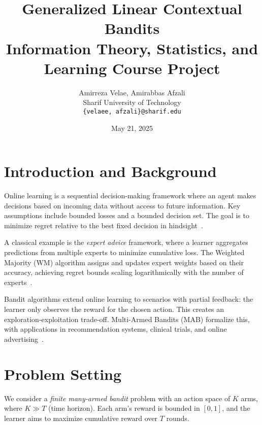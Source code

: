 \documentclass[10pt,twocolumn]{article}
\title{Generalized Linear Contextual Bandits\\
\large Information Theory, Statistics, and Learning Course Project}
\author{Amirreza Velae, Amirabbas Afzali\\
Sharif University of Technology\\
\texttt{\{velaee, afzali\}@sharif.edu}}
\date{May 21, 2025}
\begin{document}

\section{Introduction and Background}

Online learning is a sequential decision-making framework where an agent makes decisions based on incoming data without access to future information. Key assumptions include bounded losses and a bounded decision set. The goal is to minimize regret relative to the best fixed decision in hindsight~\cite{Hazan2016}.

A classical example is the \emph{expert advice} framework, where a learner aggregates predictions from multiple experts to minimize cumulative loss. The Weighted Majority (WM) algorithm assigns and updates expert weights based on their accuracy, achieving regret bounds scaling logarithmically with the number of experts~\cite{Littlestone1994}.

Bandit algorithms extend online learning to scenarios with partial feedback: the learner only observes the reward for the chosen action. This creates an exploration-exploitation trade-off. Multi-Armed Bandits (MAB) formalize this, with applications in recommendation systems, clinical trials, and online advertising~\cite{Auer2002}.

\section{Problem Setting}

We consider a \emph{finite many-armed bandit} problem with an action space of $K$ arms, where $K \gg T$ (time horizon). Each arm's reward is bounded in $[0,1]$, and the learner aims to maximize cumulative reward over $T$ rounds.
\end{document}
